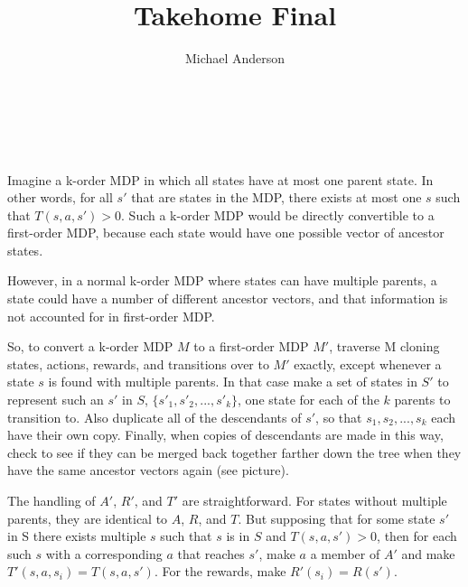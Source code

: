 \documentclass{article}
\author{Michael Anderson}
\title{Takehome Final}
\begin{document}
\maketitle
{}
\\
\flushleft
\newpage

\section{}
Imagine a k-order MDP in which all states have at most one parent state. In
other words, for all $s'$ that are states in the MDP, there exists at most one
$s$ such that $T(s,a,s') > 0$. Such a k-order MDP would be directly
convertible to a first-order MDP, because each state would have one
possible vector of ancestor states.

\vspace{1em}

However, in a normal k-order MDP where states can have multiple parents,
a state could have a number of different ancestor vectors, and that information
is not accounted for in first-order MDP.

\vspace{1em}

So, to convert a k-order MDP $M$ to a first-order MDP $M'$, traverse M cloning
states, actions, rewards, and transitions over to $M'$ exactly, except
whenever a state $s$ is found with multiple parents. In that case make a set of 
states in $S'$ to represent such an $s'$ in $S$, $\{s'_1,s'_2,...,s'_k\}$,
one state for each of the $k$ parents to transition to. Also
duplicate all of the descendants of $s'$, so that {$s_1,s_2,...,s_k$} each have 
their
own copy. Finally, when copies of descendants are made in this way, check to
see if they can be merged back together farther down the tree when they have the
same ancestor vectors again (see picture).

\vspace{1em}

The handling of $A'$, $R'$, and $T'$ are straightforward. For states without
multiple
parents, they are identical to $A$, $R$, and $T$. But supposing that for some
state
$s'$ in S there exists multiple $s$ such that $s$ is in $S$ and $T(s,a,s') > 0$,
then for each such $s$ with a corresponding $a$ that reaches $s'$, make $a$ a
member of $A'$ and make $T'(s,a,s_i) = T(s,a,s')$. For the rewards, make
$R'(s_i) = R(s')$.

\vspace{1em}
\end{document}
